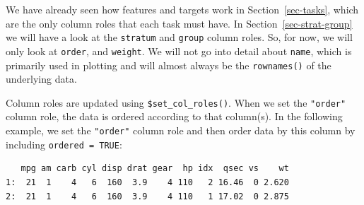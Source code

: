 We have already seen how features and targets work in
Section~\ref{sec-tasks}, which are the only column roles that each task
must have. In Section~\ref{sec-strat-group} we will have a look at the
\texttt{stratum} and \texttt{group} column roles. So, for now, we will
only look at \texttt{order}, and \texttt{weight}. We will not go into
detail about \texttt{name}, which is primarily used in plotting and will
almost always be the \texttt{rownames()} of the underlying data.

Column roles are updated using
\texttt{\$set\_col\_roles()}.
When we set the \texttt{"order"} column role, the data is ordered
according to that column(s). In the following example, we set the
\texttt{"order"} column role and then order data by this column by
including \texttt{ordered\ =\ TRUE}:

\begin{Shaded}
\begin{Highlighting}[]
\OtherTok{=} \NormalTok{(mtcars[}\SpecialCharTok{:}\NormalTok{, ], } \SpecialCharTok{:}\NormalTok{)}
\OtherTok{=}  \NormalTok{)}
\SpecialCharTok{$}\NormalTok{(} \NormalTok{)}
\end{Highlighting}
\end{Shaded}

\begin{verbatim}
   mpg am carb cyl disp drat gear  hp idx  qsec vs    wt
1:  21  1    4   6  160  3.9    4 110   2 16.46  0 2.620
2:  21  1    4   6  160  3.9    4 110   1 17.02  0 2.875
\end{verbatim}

\begin{Shaded}
\begin{Highlighting}[]
\SpecialCharTok{$}\NormalTok{(}\NormalTok{, } \NormalTok{)}
\SpecialCharTok{$}\NormalTok{(} \NormalTok{)}
\end{Highlighting}
\end{Shaded}

